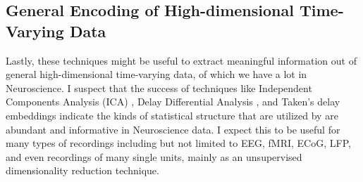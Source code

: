 \subsection{General Encoding of High-dimensional Time-Varying Data}
Lastly, these techniques might be useful to extract meaningful information out of general high-dimensional time-varying data, of which we have a lot in Neuroscience. I suspect that the success of techniques like Independent Components Analysis (ICA) \cite{ICA}, Delay Differential Analysis \cite{DDA}, and Taken's delay embeddings indicate the kinds of statistical structure that are utilized by \CPC are abundant and informative in Neuroscience data. I expect this to be useful for many types of recordings including but not limited to EEG, fMRI, ECoG, LFP, and even recordings of many single units, mainly as an unsupervised dimensionality reduction technique.